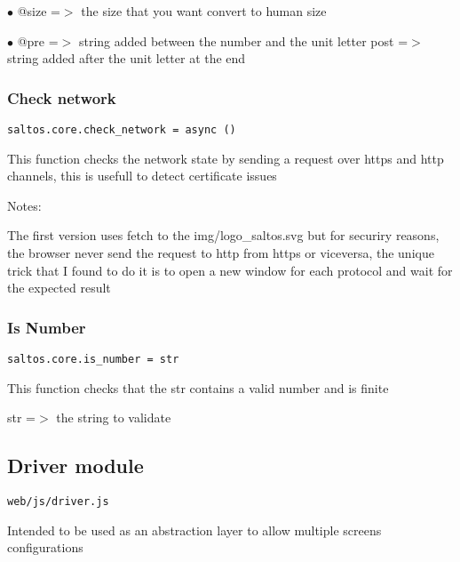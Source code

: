 \documentclass[a4paper]{article}
\begin{document}
\begin{compactitem}
\item[\color{myblue}$\bullet$] @size  =$>$ the size that you want convert to human size
\item[\color{myblue}$\bullet$] @pre  =$>$ string added between the number and the unit letter
post  =$>$ string added after the unit letter at the end
\end{compactitem}

\hypertarget{toc721}{}
\subsubsection{Check network}

\begin{lstlisting}
saltos.core.check_network = async ()
\end{lstlisting}

This function checks the network state by sending a request over https and http
channels, this is usefull to detect certificate issues

Notes:

The first version uses fetch to the img/logo\_saltos.svg but for securiry reasons,
the browser never send the request to http from https or viceversa, the unique trick
that I found to do it is to open a new window for each protocol and wait for the
expected result

\hypertarget{toc722}{}
\subsubsection{Is Number}

\begin{lstlisting}
saltos.core.is_number = str
\end{lstlisting}

This function checks that the str contains a valid number and is finite

str =$>$ the string to validate

\hypertarget{toc723}{}
\subsection{Driver module}

\begin{lstlisting}
web/js/driver.js
\end{lstlisting}

Intended to be used as an abstraction layer to allow multiple screens configurations
\end{document}
